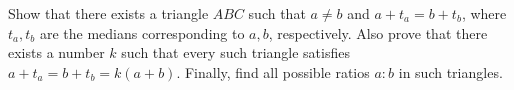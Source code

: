 Show that there exists a triangle $ABC$ such that $a \ne b$ and $a+t_a = b+t_b$, where $t_a,t_b$ are the medians corresponding to $a,b$, respectively. Also prove that there exists a number $k$ such that every such triangle satisfies $a+t_a = b+t_b = k(a+b)$. Finally, find all possible ratios $a : b$ in such triangles.
